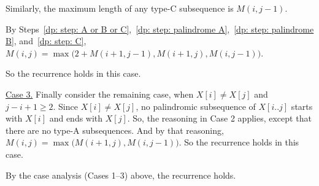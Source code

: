 \begin{longFormProof}
\begin{block}
    \smallskip
    
    \step\label{dp: step: C}
    Similarly, the maximum length of any type-C subsequence is $M(i, j-1)$.
    
    \smallskip 

    \step By Steps~\ref{dp: step: A or B or C},~\ref{dp: step: palindrome A},~\ref{dp: step: palindrome B}, and~\ref{dp: step: C},
    $M(i, j) = \max\big(2+M(i+1, j-1), M(i+1, j), M(i, j-1)\big)$.

    \step So the recurrence holds in this case.
  \end{block}

  \smallskip 
  \begin{block}
    \step \underline{Case 3.}  Finally consider the remaining case, when $X[i] \ne X[j]$ and $j-i+1\ge 2$.
    \step Since $X[i]\ne X[j]$, no palindromic subsequence of $X[i..j]$ starts with $X[i]$ and ends with $X[j]$.
    \step So, the reasoning in Case 2 applies, except that there are no type-A subsequences.
    \step And by that reasoning, $M(i, j) = \max\big(M(i+1, j), M(i, j-1)\big)$.
    \step So the recurrence holds in this case.
  \end{block}

  \smallskip
  \step By the case analysis (Cases 1--3) above, the recurrence holds.
\end{longFormProof}







